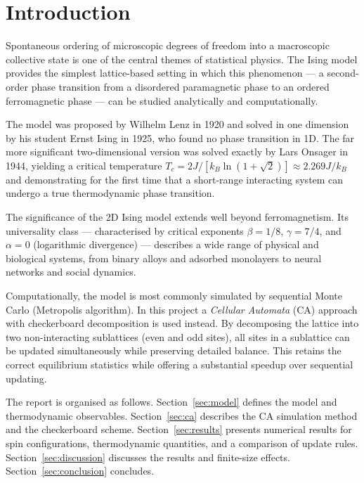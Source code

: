 \documentclass[11pt,a4paper]{article}
\begin{document}
\tableofcontents
\newpage

\section{Introduction}
\label{sec:intro}

Spontaneous ordering of microscopic degrees of freedom into a macroscopic
collective state is one of the central themes of statistical physics.
The Ising model provides the simplest lattice-based setting in which this
phenomenon --- a second-order phase transition from a disordered paramagnetic
phase to an ordered ferromagnetic phase --- can be studied analytically and
computationally.

The model was proposed by Wilhelm Lenz in 1920 and solved in one dimension by
his student Ernst Ising in 1925, who found no phase transition in 1D. The
far more significant two-dimensional version was solved exactly by Lars Onsager
in 1944, yielding a critical temperature
$T_c = 2J/[k_B\ln(1+\sqrt{2})] \approx 2.269J/k_B$ and demonstrating for
the first time that a short-range interacting system can undergo a true
thermodynamic phase transition.

The significance of the 2D Ising model extends well beyond ferromagnetism.
Its universality class --- characterised by critical exponents
$\beta = 1/8$, $\gamma = 7/4$, and $\alpha = 0$ (logarithmic divergence) ---
describes a wide range of physical and biological systems, from binary alloys
and adsorbed monolayers to neural networks and social dynamics.

Computationally, the model is most commonly simulated by sequential Monte Carlo
(Metropolis algorithm). In this project a \emph{Cellular Automata} (CA) approach
with checkerboard decomposition is used instead. By decomposing the lattice into
two non-interacting sublattices (even and odd sites), all sites in a sublattice
can be updated simultaneously while preserving detailed balance. This retains
the correct equilibrium statistics while offering a substantial speedup over
sequential updating.

The report is organised as follows. Section~\ref{sec:model} defines the model
and thermodynamic observables. Section~\ref{sec:ca} describes the CA simulation
method and the checkerboard scheme. Section~\ref{sec:results} presents numerical
results for spin configurations, thermodynamic quantities, and a comparison of
update rules. Section~\ref{sec:discussion} discusses the results and
finite-size effects. Section~\ref{sec:conclusion} concludes.
\end{document}

